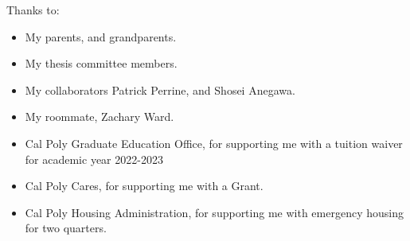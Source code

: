 \noindent
Thanks to:
\begin{itemize}
    \item My parents, and grandparents.
    \item My thesis committee members.
    \item My collaborators Patrick Perrine, and Shosei Anegawa.
    \item My roommate, Zachary Ward.
    \item Cal Poly Graduate Education Office, for supporting me with a tuition waiver for academic year 2022-2023
    \item Cal Poly Cares, for supporting me with a Grant. 
    \item Cal Poly Housing Administration, for supporting me with emergency housing for two quarters.
\end{itemize}
